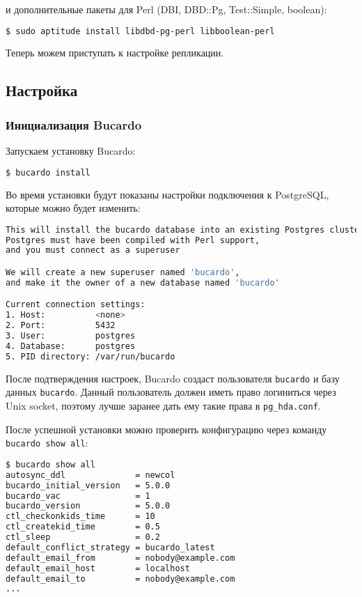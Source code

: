 и дополнительные пакеты для Perl (DBI, DBD::Pg, Test::Simple, boolean):

\begin{lstlisting}[language=Bash,label=lst:bucardo-packet1,caption=Установка]
$ sudo aptitude install libdbd-pg-perl libboolean-perl
\end{lstlisting}

Теперь можем приступать к настройке репликации.

\subsection{Настройка}

\subsubsection{Инициализация Bucardo}

Запускаем установку Bucardo:

\begin{lstlisting}[language=Bash,label=lst:bucardo5,caption=Инициализация Bucardo]
$ bucardo install
\end{lstlisting}

Во время установки будут показаны настройки подключения к PostgreSQL, которые можно будет изменить:

\begin{lstlisting}[language=Bash,label=lst:bucardo6,caption=Инициализация Bucardo]
This will install the bucardo database into an existing Postgres cluster.
Postgres must have been compiled with Perl support,
and you must connect as a superuser

We will create a new superuser named 'bucardo',
and make it the owner of a new database named 'bucardo'

Current connection settings:
1. Host:          <none>
2. Port:          5432
3. User:          postgres
4. Database:      postgres
5. PID directory: /var/run/bucardo
\end{lstlisting}

После подтверждения настроек, Bucardo создаст пользователя \lstinline!bucardo! и базу данных \lstinline!bucardo!.
Данный пользователь должен иметь право логиниться через Unix socket, поэтому лучше заранее дать ему такие права в \lstinline!pg_hda.conf!.

После успешной установки можно проверить конфигурацию через команду \lstinline!bucardo show all!:

\begin{lstlisting}[language=Bash,label=lst:bucardo-status1,caption=Инициализация Bucardo]
$ bucardo show all
autosync_ddl              = newcol
bucardo_initial_version   = 5.0.0
bucardo_vac               = 1
bucardo_version           = 5.0.0
ctl_checkonkids_time      = 10
ctl_createkid_time        = 0.5
ctl_sleep                 = 0.2
default_conflict_strategy = bucardo_latest
default_email_from        = nobody@example.com
default_email_host        = localhost
default_email_to          = nobody@example.com
...
\end{lstlisting}

